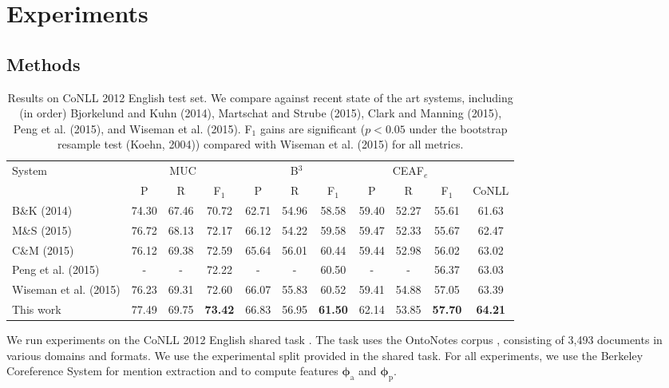 \documentclass[11pt,letterpaper]{article}
\newcommand{\aphi}{\boldsymbol{\phi}_{\mathrm{a}}}
\newcommand{\pwphi}{\boldsymbol{\phi}_{\mathrm{p}}}
\newcommand{\zro}{{\color{white}0}}
\begin{document}
\section{Experiments}

\subsection{Methods}
\begin{table*}[htpb]
\small
\centering
\begin{tabular}{lcccccccccc}
\toprule 
\multirow{2}{*}{System} & \multicolumn{3}{c}{MUC} & \multicolumn{3}{c}{B$^3$}  & \multicolumn{3}{c}{CEAF$_e$} \\
 & P & R & F$_1$ & P & R & F$_1$ & P & R & F$_1$ & CoNLL \\ 
\midrule 
B\&K (2014) & 74.3\zro & 67.46 & 70.72 & 62.71 & 54.96 & 58.58 & 59.4\zro & 52.27 & 55.61 & 61.63 \\
M\&S (2015) & 76.72 & 68.13 & 72.17 & 66.12 & 54.22 & 59.58 & 59.47 & 52.33 & 55.67 & 62.47 \\
C\&M (2015) & 76.12 & 69.38 & 72.59 & 65.64 & 56.01 & 60.44 & 59.44 & 52.98 & 56.02 & 63.02 \\
Peng et al. (2015) & - & - & 72.22 & - & - & 60.50 & - & - & 56.37 & 63.03 \\
Wiseman et al. (2015) & 76.23 & 69.31 & 72.60 & 66.07 & 55.83 & 60.52 & 59.41 & 54.88 & 57.05 &  63.39 \\
This work & 77.49 & 69.75 & \textbf{73.42} & 66.83 & 56.95 & \textbf{61.50} & 62.14 & 53.85 & \textbf{57.70} & \textbf{64.21} \\
\bottomrule 
\end{tabular} 
\caption{Results on CoNLL 2012 English test set. We compare against recent state of the art systems, including (in order) Bjorkelund and Kuhn (2014), Martschat and Strube (2015), Clark and Manning (2015), Peng et al. (2015), and Wiseman et al. (2015). F$_1$ gains are significant ($p < 0.05$ under the bootstrap resample test (Koehn, 2004)) compared with Wiseman et al. (2015) for all metrics.
}
\label{tab:mainresults}
\end{table*}


We run experiments on the CoNLL 2012 English shared task
\cite{conll12}. The task uses the OntoNotes corpus
\cite{hovy2006ontonotes}, consisting of 3,493 documents in various
domains and formats.  We
use the experimental split provided in the shared task.  For all
experiments, we use the Berkeley Coreference System \cite{DandK:13}
for mention extraction and to compute features $\aphi$ and
$\pwphi$.
\end{document}
